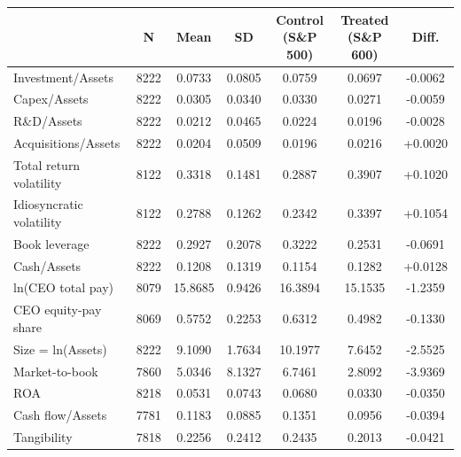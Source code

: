 \begin{tabular}{lcccccc}
\toprule
 & N & Mean & SD & \shortstack{Control\\(S\&P 500)} & \shortstack{Treated\\(S\&P 600)} & Diff. \\
\midrule
Investment/Assets & 8222 & 0.0733 & 0.0805 & 0.0759 & 0.0697 & -0.0062 \\
Capex/Assets & 8222 & 0.0305 & 0.0340 & 0.0330 & 0.0271 & -0.0059 \\
R\&D/Assets & 8222 & 0.0212 & 0.0465 & 0.0224 & 0.0196 & -0.0028 \\
Acquisitions/Assets & 8222 & 0.0204 & 0.0509 & 0.0196 & 0.0216 & +0.0020 \\
Total return volatility & 8122 & 0.3318 & 0.1481 & 0.2887 & 0.3907 & +0.1020 \\
Idiosyncratic volatility & 8122 & 0.2788 & 0.1262 & 0.2342 & 0.3397 & +0.1054 \\
Book leverage & 8222 & 0.2927 & 0.2078 & 0.3222 & 0.2531 & -0.0691 \\
Cash/Assets & 8222 & 0.1208 & 0.1319 & 0.1154 & 0.1282 & +0.0128 \\
ln(CEO total pay) & 8079 & 15.8685 & 0.9426 & 16.3894 & 15.1535 & -1.2359 \\
CEO equity-pay share & 8069 & 0.5752 & 0.2253 & 0.6312 & 0.4982 & -0.1330 \\
Size = ln(Assets) & 8222 & 9.1090 & 1.7634 & 10.1977 & 7.6452 & -2.5525 \\
Market-to-book & 7860 & 5.0346 & 8.1327 & 6.7461 & 2.8092 & -3.9369 \\
ROA & 8218 & 0.0531 & 0.0743 & 0.0680 & 0.0330 & -0.0350 \\
Cash flow/Assets & 7781 & 0.1183 & 0.0885 & 0.1351 & 0.0956 & -0.0394 \\
Tangibility & 7818 & 0.2256 & 0.2412 & 0.2435 & 0.2013 & -0.0421 \\
\bottomrule
\end{tabular}